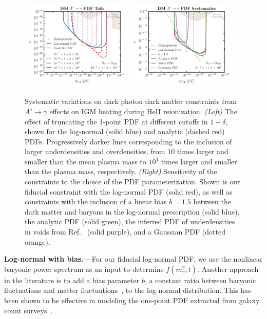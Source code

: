 \documentclass[prd,aps,10pt,nofootinbib,twocolumn,superscriptaddress,preprintnumbers,balancelastpage,longbibliography]{revtex4-1}
\begin{document}
\begin{figure}[tbp]
    \label{fig:limit_dp_systematics}
\end{figure}
%

%
\begin{figure}[tbp]
    \centering
    \includegraphics[width=0.47\textwidth]{plots/limit_dp_dm_pdf_tails}
    \includegraphics[width=0.47\textwidth]{plots/limit_dp_dm_pdfs}
    \caption{Systematic variations on dark photon dark matter constraints from $A'\to \gamma$ effects on IGM heating during HeII reionization. \emph{(Left)} The effect of truncating the 1-point PDF at different cutoffs in $1 + \delta$, shown for the log-normal (solid blue) and analytic (dashed red) PDFs. Progressively darker lines corresponding to the inclusion of larger underdensities and overdensities, from 10 times larger and smaller than the mean plasma mass to $10^4$ times larger and smaller than the plasma mass, respectively. \emph{(Right)} Sensitivity of the constraints to the choice of the PDF parameterization. Shown is our fiducial constraint with the log-normal PDF (solid red), as well as constraints with the inclusion of a linear bias $b=1.5$ between the dark matter and baryons in the log-normal prescription (solid blue), the analytic PDF (solid green), the inferred PDF of underdensities in voids from Ref.~\cite{Adermann:2018jba} (solid purple), and a Gaussian PDF (dotted orange). } 
    \label{fig:limit_dp_dm_systematics}
\end{figure}
%

\noindent
{\bf Log-normal with bias.---}For our fiducial log-normal PDF, we use the nonlinear baryonic power spectrum as an input to determine $f(m_\gamma^2;t)$. Another approach in the literature is to add a bias parameter $b$, a constant ratio between baryonic fluctuations and matter fluctuations~\cite{Dekel:1998eq},  to the log-normal distribution. This has been shown to be effective in modeling the one-point PDF extracted from galaxy count surveys~\cite{Wild:2004me,Hurtado-Gil:2017dbm}. 
\end{document}
